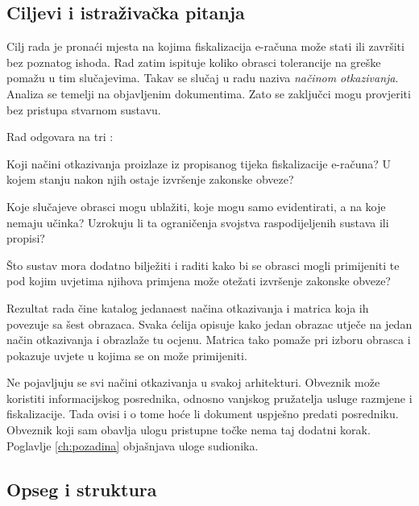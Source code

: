 \subsection{Ciljevi i istraživačka pitanja}
\label{sec:ciljevi}

Cilj rada je pronaći mjesta na kojima fiskalizacija e-računa može stati ili
završiti bez poznatog ishoda. Rad zatim ispituje koliko obrasci tolerancije na
greške pomažu u tim slučajevima. Takav se slučaj u radu naziva
\emph{načinom otkazivanja}. Analiza se temelji na objavljenim dokumentima.
Zato se zaključci mogu provjeriti bez pristupa stvarnom sustavu.

Rad odgovara na tri :

\begin{description}[leftmargin=1.6cm, style=nextline]
  \item[RQ1] Koji načini otkazivanja proizlaze iz propisanog tijeka
  fiskalizacije e-računa? U kojem stanju nakon njih ostaje izvršenje
  zakonske obveze?

  \item[RQ2] Koje slučajeve obrasci mogu ublažiti, koje mogu samo
  evidentirati, a na koje nemaju učinka? Uzrokuju li ta ograničenja svojstva
  raspodijeljenih sustava ili propisi?

  \item[RQ3] Što sustav mora dodatno bilježiti i raditi kako bi se obrasci
  mogli primijeniti te pod kojim uvjetima njihova primjena može otežati
  izvršenje zakonske obveze?
\end{description}

Rezultat rada čine katalog jedanaest načina otkazivanja i matrica koja ih
povezuje sa šest obrazaca. Svaka ćelija opisuje kako jedan obrazac utječe na
jedan način otkazivanja i obrazlaže tu ocjenu. Matrica tako pomaže pri izboru
obrasca i pokazuje uvjete u kojima se on može primijeniti.

Ne pojavljuju se svi načini otkazivanja u svakoj arhitekturi. Obveznik može
koristiti informacijskog posrednika, odnosno vanjskog pružatelja usluge
razmjene i fiskalizacije. Tada ovisi i o tome hoće li dokument uspješno
predati posredniku. Obveznik koji sam obavlja ulogu pristupne točke nema taj
dodatni korak. Poglavlje \ref{ch:pozadina} objašnjava uloge sudionika.

\subsection{Opseg i struktura}
\label{sec:opseg-rada}

